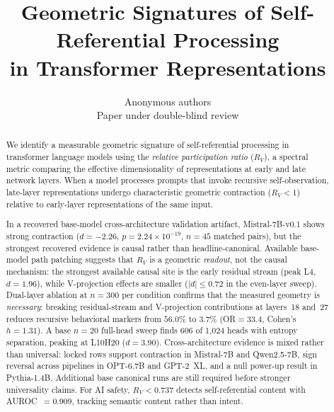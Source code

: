\documentclass{article}
\title{Geometric Signatures of Self-Referential Processing\\
       in Transformer Representations}
\author{Anonymous authors\\Paper under double-blind review}
\newcommand{\RV}{R_V}
\newcommand{\dcohen}{d}
\begin{document}
\ifcolmsubmission
\linenumbers
\fi

\maketitle

\begin{abstract}
We identify a measurable geometric signature of self-referential processing in transformer language
models using the \emph{relative participation ratio} ($\RV$), a spectral metric comparing the
effective dimensionality of representations at early and late network layers.
When a model processes prompts that invoke recursive self-observation, late-layer representations
undergo characteristic geometric contraction ($\RV < 1$) relative to early-layer representations
of the same input.

In a recovered base-model cross-architecture validation artifact, Mistral-7B-v0.1 shows strong
contraction ($\dcohen = -2.26$, $p = 2.24 \times 10^{-19}$, $n = 45$ matched pairs), but the strongest
recovered evidence is causal rather than headline-canonical.
Available base-model path patching suggests that $\RV$ is a geometric \emph{readout}, not the causal
mechanism: the strongest available causal site is the early residual stream
(peak L4, $\dcohen = 1.96$), while V-projection effects are smaller
($|\dcohen| \leq 0.72$ in the even-layer sweep).
Dual-layer ablation at $n{=}300$ per condition confirms that the measured geometry is
\emph{necessary}: breaking residual-stream and V-projection contributions at layers~18 and~27
reduces recursive behavioral markers from $56.0\%$ to $3.7\%$
(OR${=}33.4$, Cohen's $h = 1.31$).
A base $n=20$ full-head sweep finds 606 of 1{,}024 heads with entropy separation, peaking at
L10H20 ($\dcohen = 3.90$).
Cross-architecture evidence is mixed rather than universal: locked rows support contraction in
Mistral-7B and Qwen2.5-7B, sign reversal across pipelines in OPT-6.7B and GPT-2~XL, and a null
power-up result in Pythia-1.4B.
Additional base canonical runs are still required before stronger universality claims.
For AI safety, $\RV < 0.737$ detects self-referential content with AUROC~$= 0.909$,
tracking semantic content rather than intent.
\end{abstract}


\end{document}

